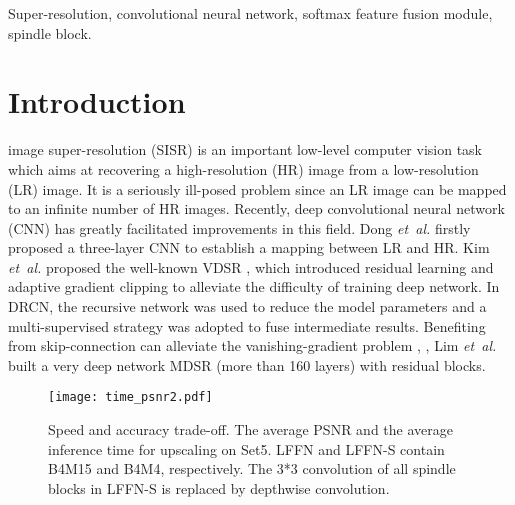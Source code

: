 \documentclass[journal]{IEEEtran}
\begin{document}
\begin{IEEEkeywords}
Super-resolution, convolutional neural network, softmax feature fusion module, spindle block.
\end{IEEEkeywords}






\IEEEpeerreviewmaketitle



\section{Introduction}
 image super-resolution (SISR) is an important low-level computer vision task which aims at recovering a high-resolution (HR) image from a low-resolution (LR) image. It is a seriously ill-posed problem since an LR image can be mapped to an infinite number of HR images. Recently, deep convolutional neural network (CNN) has greatly facilitated improvements in this field. Dong \emph{et~al.} \cite{dong2014learning} firstly proposed a three-layer CNN to establish a mapping between LR and HR. Kim \emph{et~al.} proposed the well-known VDSR \cite{Kim2016Accurate}, which introduced residual learning and adaptive gradient clipping to alleviate the difficulty of training deep network. In DRCN\cite{kim2016deeply}, the recursive network was used to reduce the model parameters and a multi-supervised strategy was adopted to fuse intermediate results. Benefiting from skip-connection can alleviate the vanishing-gradient problem \cite{he2016deep}, \cite{chu2018novel}, Lim \emph{et~al.} \cite{lim2017enhanced} built a very deep network MDSR (more than 160 layers) with residual blocks. 

\begin{figure}[ht]
\centering
\texttt{[image: time\_psnr2.pdf]}
\caption{Speed and accuracy trade-off. The average PSNR and the average inference time for upscaling  on Set5. LFFN and LFFN-S contain B4M15 and B4M4, respectively. The 3*3 convolution of all spindle blocks in LFFN-S is replaced by depthwise convolution.}
\label{fig:trade_off_time_psnr}
\end{figure}
\end{document}

